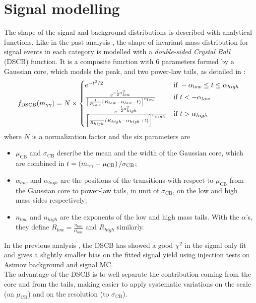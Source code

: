 \section{Signal modelling}
\label{sec:signal_model}

The shape of the signal and background \myy distributions is described with analytical functions. Like in the past analysis \cite{Hasib:2238687}, the shape of \myy invariant mass distribution for signal events in each category is modelled with a \emph{double-sided Crystal Ball} (DSCB) function. It is a composite function with 6 parameters formed by a Gaussian core, which models the peak, and two power-law tails, as detailed in \Eqn{\ref{eq:DSCB}}:
\begin{align}
	f_\text{DSCB}(m_{\gamma\gamma}) = N \times
	\begin{cases}
		e^{-t^{2}/2} & \text{if } -\alpha_{low} \leq t \leq \alpha_{high} \\
		\frac{ e^{-{}^{1}_{2} \alpha_{low}^{2}} } { \left[ \frac{1}{R_{low}} \left(R_{low} - \alpha_{low} - t \right) \right]^{n_{low}} } & \text{if } t < -\alpha_{low} \\
		\frac{ e^{-{}^{1}_{2} \alpha_{high}^{2}} } { \left[ \frac{1}{R_{high}} \left(R_{high} - \alpha_{high} + t \right) \right]^{n_{high}} } & \text{if } t > \alpha_{high} \\
	\end{cases}
	\label{eq:DSCB}
\end{align}
where $N$ is a normalization factor and the six parameters are
\begin{itemize}
	\item $\mu_\text{CB}$ and $\sigma_\text{CB}$ describe the mean and the width of the Gaussian core, which are combined in $t = \left(m_{\gamma\gamma} - \mu_\text{CB}\right) / \sigma_\text{CB}$;
	\item $\alpha_{low}$ and $\alpha_{high}$ are the positions of the transitions with respect to $\mu_\text{CB}$ from the Gaussian core to power-law tails, in unit of $\sigma_\text{CB}$, on the low and high mass sides respectively;
	\item $n_{low}$ and $n_{high}$ are the exponents of the low and high mass tails. With the $\alpha$'s, they define $R_{low} = \frac{n_{low}}{\alpha_{low}}$ and $R_{high}$ similarly.
\end{itemize}

In the previous analysis \cite{Hasib:2238687} , the DSCB has showed a good $\chi^2$ in the signal only fit and gives a slightly smaller bias on the fitted signal yield using injection tests on Asimov background and signal MC. \\ The advantage of the DSCB is to well separate the contribution coming from the core and from the tails, making easier to apply systematic variations on the scale (on $\mu_\text{CB}$) and on the resolution (to $\sigma_\text{CB}$). \\

